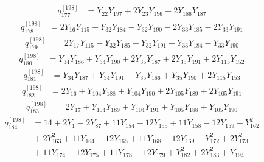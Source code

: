 \begin{equation}\label{q198:row:177}
\begin{aligned}
q_{177}^{[198]} &={} Y_{22}Y_{197} + 2Y_{23}Y_{196} - 2Y_{186}Y_{187}
\end{aligned}
\end{equation}
\begin{equation}\label{q198:row:178}
\begin{aligned}
q_{178}^{[198]} &={} 2Y_{16}Y_{115} - Y_{32}Y_{184} - Y_{32}Y_{190} - 2Y_{33}Y_{185} - 2Y_{33}Y_{191}
\end{aligned}
\end{equation}
\begin{equation}\label{q198:row:179}
\begin{aligned}
q_{179}^{[198]} &={} 2Y_{17}Y_{115} - Y_{32}Y_{185} - Y_{32}Y_{191} - Y_{33}Y_{184} - Y_{33}Y_{190}
\end{aligned}
\end{equation}
\begin{equation}\label{q198:row:180}
\begin{aligned}
q_{180}^{[198]} &={} Y_{34}Y_{186} + Y_{34}Y_{190} + 2Y_{35}Y_{187} + 2Y_{35}Y_{191} + 2Y_{115}Y_{152}
\end{aligned}
\end{equation}
\begin{equation}\label{q198:row:181}
\begin{aligned}
q_{181}^{[198]} &={} Y_{34}Y_{187} + Y_{34}Y_{191} + Y_{35}Y_{186} + Y_{35}Y_{190} + 2Y_{115}Y_{153}
\end{aligned}
\end{equation}
\begin{equation}\label{q198:row:182}
\begin{aligned}
q_{182}^{[198]} &={} 2Y_{16} + Y_{104}Y_{188} + Y_{104}Y_{190} + 2Y_{105}Y_{189} + 2Y_{105}Y_{191}
\end{aligned}
\end{equation}
\begin{equation}\label{q198:row:183}
\begin{aligned}
q_{183}^{[198]} &={} 2Y_{17} + Y_{104}Y_{189} + Y_{104}Y_{191} + Y_{105}Y_{188} + Y_{105}Y_{190}
\end{aligned}
\end{equation}
\begin{equation}\label{q198:row:184}
\begin{aligned}
q_{184}^{[198]} &={} 14 + 2Y_{1} - 2Y_{87} + 11Y_{154} - 12Y_{155} + 11Y_{158} - 12Y_{159} + Y_{162}^{2}\\
&{} + 2Y_{163}^{2} + 11Y_{164} - 12Y_{165} + 11Y_{168} - 12Y_{169} + Y_{172}^{2} + 2Y_{173}^{2}\\
&{} + 11Y_{174} - 12Y_{175} + 11Y_{178} - 12Y_{179} + Y_{182}^{2} + 2Y_{183}^{2} + Y_{194}
\end{aligned}
\end{equation}
\endgroup
